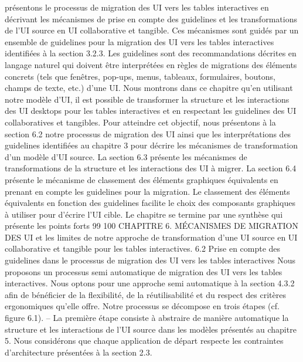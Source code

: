 \documentclass{article}
\begin{document}
pr\'{e}sentons le processus de migration des UI vers les tables interactives en d\'{e}crivant les m\'{e}canismes
de prise en compte des guidelines et les transformations de l’UI source en UI collaborative et tangible.
Ces m\'{e}canismes sont guid\'{e}s par un ensemble de guidelines pour la migration des UI vers les tables
interactives identiﬁ\'{e}es \`{a} la section 3.2.3. Les guidelines sont des recommandations d\'{e}crites en langage
naturel qui doivent \^{e}tre interpr\'{e}t\'{e}es en r\`{e}gles de migrations des \'{e}l\'{e}ments concrets (tels que fen\^{e}tres,
pop-ups, menus, tableaux, formulaires, boutons, champs de texte, etc.) d’une UI.
Nous montrons dans ce chapitre qu’en utilisant notre mod\`{e}le d’UI, il est possible de transformer la
structure et les interactions des UI desktops pour les tables interactives et en respectant les guidelines
des UI collaboratives et tangibles.
Pour atteindre cet objectif, nous pr\'{e}sentons \`{a} la section 6.2 notre processus de migration des UI
ainsi que les interpr\'{e}tations des guidelines identiﬁ\'{e}es au chapitre 3 pour d\'{e}crire les m\'{e}canismes de
transformation d’un mod\`{e}le d’UI source. La section 6.3 pr\'{e}sente les m\'{e}canismes de transformations
de la structure et les interactions des UI \`{a} migrer. La section 6.4 pr\'{e}sente le m\'{e}canisme de classement
des \'{e}l\'{e}ments graphiques \'{e}quivalents en prenant en compte les guidelines pour la migration. Le classement des \'{e}l\'{e}ments \'{e}quivalents en fonction des guidelines facilite le choix des composants graphiques
\`{a} utiliser pour d’\'{e}crire l’UI cible. Le chapitre se termine par une synth\`{e}se qui pr\'{e}sente les points forts
99
100
CHAPITRE 6. MÉCANISMES DE MIGRATION DES UI
et les limites de notre approche de transformation d’une UI source en UI collaborative et tangible pour
les tables interactives.
6.2
Prise en compte des guidelines dans le processus de migration des
UI vers les tables interactives
Nous proposons un processus semi automatique de migration des UI vers les tables interactives.
Nous optons pour une approche semi automatique \`{a} la section 4.3.2 aﬁn de b\'{e}n\'{e}ﬁcier de la ﬂexibilit\'{e}, de la r\'{e}utilisabilit\'{e} et du respect des crit\`{e}res ergonomiques qu’elle offre. Notre processus se
d\'{e}compose en trois \'{e}tapes (cf. ﬁgure 6.1).
– La premi\`{e}re \'{e}tape consiste \`{a} abstraire de mani\`{e}re automatique la structure et les interactions de
l’UI source dans les mod\`{e}les pr\'{e}sent\'{e}s au chapitre 5. Nous consid\'{e}rons que chaque application
de d\'{e}part respecte les contraintes d’architecture pr\'{e}sent\'{e}es \`{a} la section 2.3.
\end{document}
